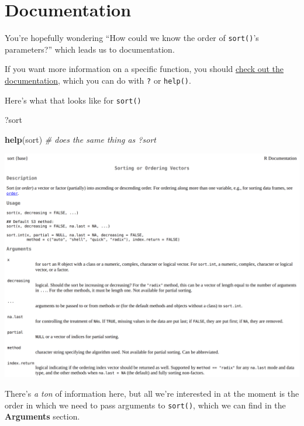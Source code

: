 \documentclass[
]{report}
\newenvironment{Shaded}{\begin{snugshade}}{\end{snugshade}}
\newcommand{\CommentTok}[1]{\textcolor[rgb]{0.56,0.35,0.01}{\textit{#1}}}
\newcommand{\KeywordTok}[1]{\textcolor[rgb]{0.13,0.29,0.53}{\textbf{#1}}}
\newcommand{\NormalTok}[1]{#1}
\begin{document}
\hypertarget{documentation}{%
\section{Documentation}\label{documentation}}

You're hopefully wondering ``How could we know the order of \texttt{sort()}'s parameters?'' which leads us to documentation.

If you want more information on a specific function, you should \href{https://en.wikipedia.org/wiki/RTFM}{check out the documentation}, which you can do with \texttt{?} or \texttt{help()}.

Here's what that looks like for \texttt{sort()}

\begin{Shaded}
\begin{Highlighting}[]
\NormalTok{?sort }
\end{Highlighting}
\end{Shaded}

\begin{Shaded}
\begin{Highlighting}[]
\KeywordTok{help}\NormalTok{(sort) }\CommentTok{\# does the same thing as \textasciigrave{}?sort\textasciigrave{}}
\end{Highlighting}
\end{Shaded}

\begin{center}\includegraphics[width=1\linewidth]{images/sort-documentation} \end{center}

There's \emph{a ton} of information here, but all we're interested in at the moment is the order in which we need to pass arguments to \texttt{sort()}, which we can find in the \textbf{Arguments} section.
\end{document}
